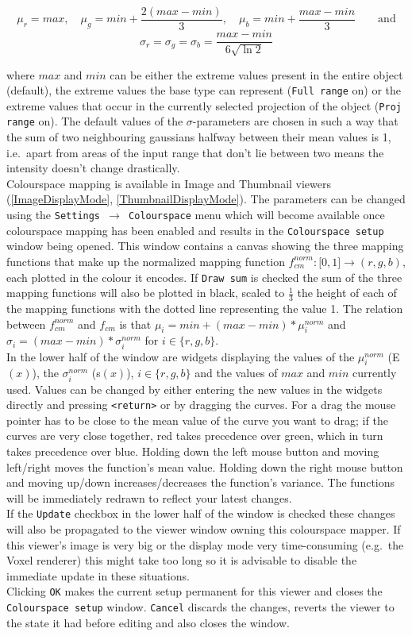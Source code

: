 \documentclass[11pt]{article}
\begin{document}
$$\mu_r = max, \quad \mu_g = min + \frac{2(max-min)}{3}, \quad \mu_b = min + \frac{max-min}{3}
\qquad \mbox{and}$$
$$\sigma_r = \sigma_g = \sigma_b = \frac{max-min}{6 \sqrt{\ln 2}}$$

where $max$ and $min$ can be either the extreme values present in the entire object
(default), the extreme values the base type can represent (\texttt{Full range} on) or the
extreme values that occur in the currently selected projection of the object (\texttt{Proj range}
on). The default values of the $\sigma$-parameters are chosen in such a way that the sum of two
neighbouring gaussians halfway between their mean values is 1, i.e.\ apart from areas of the
input range that don't lie between two means the intensity doesn't change drastically.\\
Colourspace mapping is available in Image and Thumbnail viewers (\ref{ImageDisplayMode},
\ref{ThumbnailDisplayMode}). The parameters can be changed using the
\texttt{Settings $\rightarrow$ Colourspace} menu which will become available once colourspace
mapping has been enabled and results in the \texttt{Colourspace setup} window being opened.
This window contains a canvas showing the three mapping functions that make up the normalized
mapping function $f_{cm}^{norm}: \lbrack 0,1 \rbrack \rightarrow (r,g,b)$, each
plotted in the colour it encodes. If \texttt{Draw sum} is checked the sum of the three
mapping functions will also be plotted in black, scaled to $\frac{1}{3}$ the height of
each of the mapping functions with the dotted line representing the value 1. The relation
between $f_{cm}^{norm}$ and $f_{cm}$ is that $\mu_i = min + (max - min)*\mu_i^{norm}$ and
$\sigma_i = (max - min)*\sigma_i^{norm}$ for $i \in \{r, g, b\}$.\\
In the lower half of the
window are widgets displaying the values of the $\mu_i^{norm}$ (E$(x)$), the
$\sigma_i^{norm}$ (s$(x)$), $i \in \{r,g,b\}$ and the values of $max$ and $min$ currently
used. Values can be changed by either entering the new values in the widgets directly
and pressing \texttt{<return>} or by dragging the curves. For a drag the mouse pointer has
to be close to the mean value of the curve you want to drag; if the curves are very close
together, red takes precedence over green, which in turn takes precedence over blue.
Holding down the left mouse button and moving left/right moves the function's mean value.
Holding down the right mouse button and moving up/down increases/decreases the function's
variance. The functions will be immediately redrawn to reflect your latest changes.\\
If the \texttt{Update} checkbox in the lower half of the window is checked these changes
will also be propagated to the viewer window owning this colourspace mapper. If this
viewer's image is very big or the display mode very time-consuming (e.g.\ the Voxel
renderer) this might take too long so it is advisable to disable the immediate update
in these situations.\\
Clicking \texttt{OK} makes the current setup permanent for this viewer and closes the
\texttt{Colourspace setup} window. \texttt{Cancel} discards the changes, reverts the
viewer to the state it had before editing and also closes the window.
\end{document}
